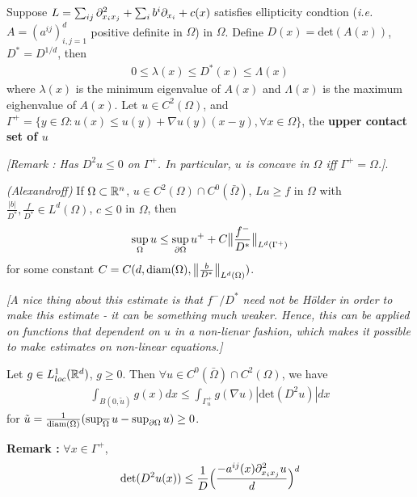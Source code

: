 \documentclass[12pt,a4paper]{article}
\begin{document}
Suppose $L = \sum_{ij} \partial^2_{x_i x_j} + \sum_{i} b^i \partial_{x_i} + c(x)$ satisfies ellipticity condtion (\textit{i.e.} $A = (a^{ij})_{i,j=1}^d$ positive definite in $\Omega$) in $\Omega$. Define $D(x) = \text{det}(A(x))$, $D^* = D^{1/d}$, then
\begin{align*}
0\leq \lambda(x) \leq D^*(x) \leq \Lambda(x)
\end{align*}
where $\lambda(x)$ is the minimum eigenvalue of $A(x)$ and $\Lambda(x)$ is the maximum eighenvalue of $A(x)$. Let $u\in C^2(\Omega)$, and $\Gamma^+ = \{y\in \Omega : u(x)\leq u(y) + \nabla u(y)(x-y), \forall x\in \Omega\}$, the \textbf{upper contact set of $u$}

\emph{[Remark : Has $D^2 u \leq 0$ on $\Gamma^+$. In particular, $u$ is concave in $\Omega$ iff $\Gamma^+ =\Omega$.]}.
\s

\thm \emph{(Alexandroff)} If $\Omega \subset \mathbb{R}^n$, $u\in C^2(\Omega) \cap C^0(\bar{\Omega})$, $Lu \geq f$ in $\Omega$ with $\frac{|b|}{D^*}, \frac{f}{D^*} \in L^d(\Omega)$, $c\leq 0$ in $\Omega$, then
\begin{align*}
\sup_{\Omega} u \leq \sup_{\partial \Omega} u^+ + C\bigl\lVert\frac{f^-}{D^*}\bigr\rVert_{L^d(\Gamma^+)}
\end{align*}
for some constant $C = C(d, \text{diam}(\Omega), \bigl\lVert\frac{b}{D^*}\bigr\rVert_{L^d(\Omega)})$.

\emph{[A nice thing about this estimate is that $f^-/D^*$ need not be H\"older in order to make this estimate - it can be something much weaker. Hence, this can be applied on functions that dependent on $u$ in a non-lienar fashion, which makes it possible to make estimates on non-linear equations.]}
\s

\lem Let $g \in L^1_{loc}(\mathbb{R}^d)$, $g\geq 0$. Then $\forall u \in C^0(\bar{\Omega}) \cap C^2(\Omega)$, we have
\begin{align*}
\int_{B(0, \tilde{u})}g(x) dx \leq \int_{\Gamma_{u}^+} g(\nabla u) |\text{det}(D^2 u)|dx
\end{align*}
for $\tilde{u} = \frac{1}{\text{diam}(\Omega)} (\sup_{\overline{\Omega}} u - \sup_{\partial \Omega} u) \geq 0$.
\s

\textbf{Remark :} $\forall x\in \Gamma^+$,
\begin{align*}
\text{det}(D^2u(x))\leq \frac{1}{D} \Big( \frac{-a^{ij}(x) \partial^2_{x_i x_j}u}{d}\Big)^d
\end{align*}
\s
\end{document}
